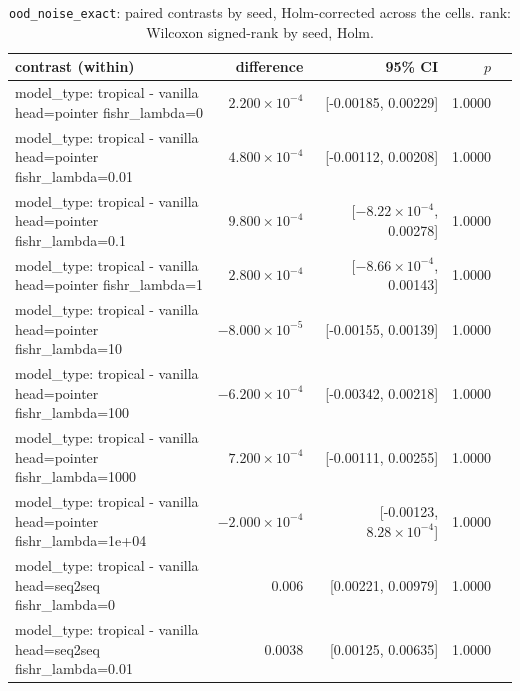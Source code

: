\documentclass[10pt]{article}
\makeatletter
\newcommand{\stackcell}[1]{\begin{tabular}[t]{@{}l@{}}#1\end{tabular}}
\makeatother
\begin{document}
{\small
\begin{longtable}{lrrrl}
\caption{\texttt{ood\_noise\_exact}: paired contrasts by seed, Holm-corrected across the cells. rank: Wilcoxon signed-rank by seed, Holm.}\label{tab:paired-ood_noise_exact}\\
\toprule
contrast (within) & difference & 95\% CI & $p$ & \\
\midrule
\endhead
\stackcell{model\_type: tropical - vanilla\\\footnotesize head=pointer fishr\_lambda=0 } & $2.200\times10^{-4}$ & [-0.00185, 0.00229] & 1.0000 & \\
\stackcell{model\_type: tropical - vanilla\\\footnotesize head=pointer fishr\_lambda=0.01 } & $4.800\times10^{-4}$ & [-0.00112, 0.00208] & 1.0000 & \\
\stackcell{model\_type: tropical - vanilla\\\footnotesize head=pointer fishr\_lambda=0.1 } & $9.800\times10^{-4}$ & [$-8.22\times10^{-4}$, 0.00278] & 1.0000 & \\
\stackcell{model\_type: tropical - vanilla\\\footnotesize head=pointer fishr\_lambda=1 } & $2.800\times10^{-4}$ & [$-8.66\times10^{-4}$, 0.00143] & 1.0000 & \\
\stackcell{model\_type: tropical - vanilla\\\footnotesize head=pointer fishr\_lambda=10 } & $-8.000\times10^{-5}$ & [-0.00155, 0.00139] & 1.0000 & \\
\stackcell{model\_type: tropical - vanilla\\\footnotesize head=pointer fishr\_lambda=100 } & $-6.200\times10^{-4}$ & [-0.00342, 0.00218] & 1.0000 & \\
\stackcell{model\_type: tropical - vanilla\\\footnotesize head=pointer fishr\_lambda=1000 } & $7.200\times10^{-4}$ & [-0.00111, 0.00255] & 1.0000 & \\
\stackcell{model\_type: tropical - vanilla\\\footnotesize head=pointer fishr\_lambda=1e+04 } & $-2.000\times10^{-4}$ & [-0.00123, $8.28\times10^{-4}$] & 1.0000 & \\
\stackcell{model\_type: tropical - vanilla\\\footnotesize head=seq2seq fishr\_lambda=0 } & 0.006 & [0.00221, 0.00979] & 1.0000 & \\
\stackcell{model\_type: tropical - vanilla\\\footnotesize head=seq2seq fishr\_lambda=0.01 } & 0.0038 & [0.00125, 0.00635] & 1.0000 & \\

\end{longtable}}
\end{document}

